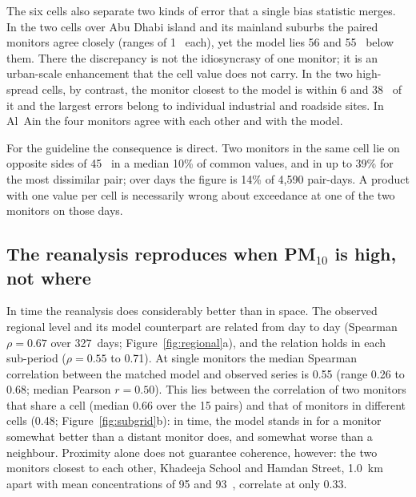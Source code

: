 The six cells also separate two kinds of error that a single bias statistic merges. In the two
cells over Abu Dhabi island and its mainland suburbs the paired monitors agree closely (ranges of
1~\ugm{} each), yet the model lies 56 and 55~\ugm{} below them. There the discrepancy is not the
idiosyncrasy of one monitor; it is an urban-scale enhancement that the cell value does not carry.
In the two high-spread cells, by contrast, the monitor closest to the model is within 6 and
38~\ugm{} of it and the largest errors belong to individual industrial and roadside sites. In
Al~Ain the four monitors agree with each other and with the model.

For the guideline the consequence is direct. Two monitors in the same cell lie on opposite sides
of 45~\ugm{} in a median 10\% of common values, and in up to 39\% for the most dissimilar pair;
over days the figure is 14\% of 4,590 pair-days. A product with one value per cell is necessarily
wrong about exceedance at one of the two monitors on those days.

\subsection{The reanalysis reproduces when PM$_{10}$ is high, not where}
\label{sec:res-when}

In time the reanalysis does considerably better than in space. The observed regional level and
its model counterpart are related from day to day (Spearman $\rho=0.67$ over 327~days;
Figure~\ref{fig:regional}a), and the relation holds in each sub-period ($\rho=0.55$ to 0.71). At
single monitors the median Spearman correlation between the matched model and observed series is
0.55 (range 0.26 to 0.68; median Pearson $r=0.50$). This lies between the correlation of two
monitors that share a cell (median 0.66 over the 15 pairs) and that of monitors in different cells
(0.48; Figure~\ref{fig:subgrid}b): in time, the model stands in for a monitor somewhat better than
a distant monitor does, and somewhat worse than a neighbour. Proximity alone does not guarantee
coherence, however: the two monitors closest to each other, Khadeeja School and Hamdan Street,
1.0~km apart with mean concentrations of 95 and 93~\ugm{}, correlate at only 0.33.

